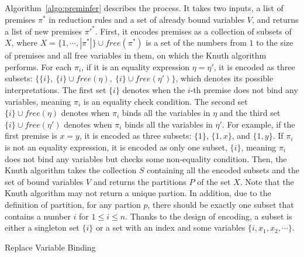Algorithm~\ref{algo:preminfer} describes the process.
It takes two inputs, a list of premises $\pi^*$ in reduction rules
and a set of already bound variables $V$, and returns a list of new premises $\pi'^*$.
First, it encodes premises as a collection of subsets of $X$,
where $X = \{1, \cdots, |\pi^*|\} \cup \mathit{free}(\pi^*)$
is a set of the numbers from $1$ to the size of premises
and all free variables in them, on which the Knuth algorithm performs.
For each $\pi_i$, if it is an equality expression $\eta = \eta'$,
it is encoded as three subsets: $\{\{i\},\ \{i\}\cup\mathit{free}(\eta),\ \{i\}\cup\mathit{free}(\eta')\}$,
which denotes its possible interpretations.
The first set $\{i\}$ denotes when the $i$-th premise does not bind any variables,
meaning $\pi_i$ is an equality check condition.
The second set $\{i\} \cup \mathit{free}(\eta)$ denotes when $\pi_i$ binds all the variables in $\eta$ and
the third set $\{i\} \cup \mathit{free}(\eta')$ denotes when $\pi_i$ binds all the variables in $\eta'$.
For example, if the first premise is $x = y$, it is encoded as three subsets: $\{1\}$, $\{1, x\}$, and $\{1, y\}$.
If $\pi_i$ is not an equality expression, it is encoded as only one subset, $\{i\}$,
meaning $\pi_i$ does not bind any variables but checks some non-equality condition.
Then, the Knuth algorithm takes the collection $S$ containing all the encoded subsets and
the set of bound variables $V$ and returns the partitions $P$ of the set $X$.
Note that the Knuth algorithm may not return a unique partion.
In addition, due to the definition of partition, for any partion $p$,
there should be exactly one subset that contains a number $i$ for $1 \le i \le n$.
Thanks to the design of encoding, a subset is either a singleton set $\{i\}$ or
a set with an index and some variables $\{i, x_1, x_2, \cdots\}$.

\begin{algorithm}[t]
\DontPrintSemicolon
{}
 {
}
\caption{Replace Variable Binding}
\label{algo:binding}
\end{algorithm}

